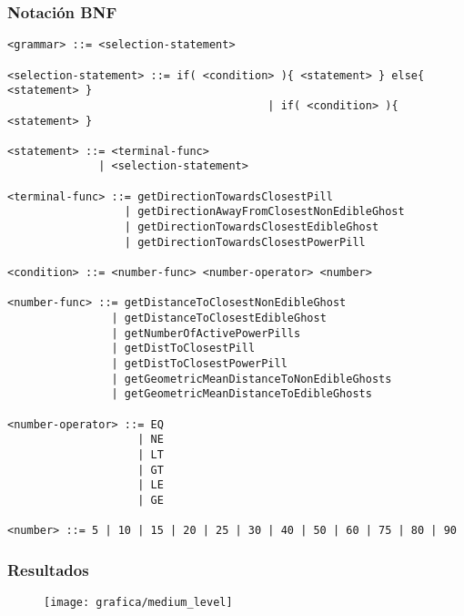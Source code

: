 \subsubsection{Notación BNF}
\begin{lstlisting}[frame=single, breaklines=no, basicstyle=\fontsize{10}{11}\ttfamily, caption=Gramática de medio nivel]
<grammar> ::= <selection-statement>

<selection-statement> ::= if( <condition> ){ <statement> } else{ <statement> }
                                        | if( <condition> ){ <statement> }

<statement> ::= <terminal-func>
              | <selection-statement>

<terminal-func> ::= getDirectionTowardsClosestPill
                  | getDirectionAwayFromClosestNonEdibleGhost
                  | getDirectionTowardsClosestEdibleGhost
                  | getDirectionTowardsClosestPowerPill
                  
<condition> ::= <number-func> <number-operator> <number>

<number-func> ::= getDistanceToClosestNonEdibleGhost
                | getDistanceToClosestEdibleGhost
                | getNumberOfActivePowerPills
                | getDistToClosestPill
                | getDistToClosestPowerPill
                | getGeometricMeanDistanceToNonEdibleGhosts
                | getGeometricMeanDistanceToEdibleGhosts

<number-operator> ::= EQ
                    | NE
                    | LT
                    | GT
                    | LE
                    | GE

<number> ::= 5 | 10 | 15 | 20 | 25 | 30 | 40 | 50 | 60 | 75 | 80 | 90
\end{lstlisting}

\subsubsection{Resultados}
\begin{figure}[H]
\centering
\texttt{[image: grafica/medium\_level]}
\end{figure}

